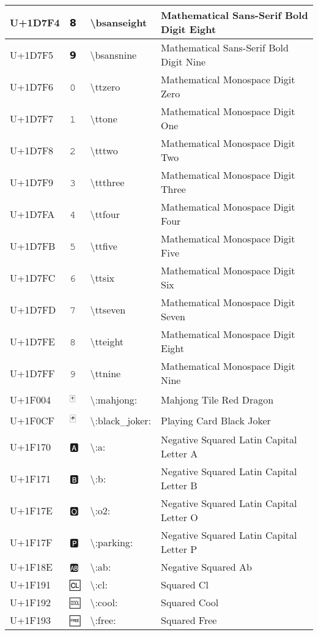 \begin{table}[h]
\begin{tabulary}{\linewidth}{|L|L|L|L|}
\hline
U+1D7F4 & 𝟴 & {\textbackslash}bsanseight & Mathematical Sans-Serif Bold Digit Eight \\
\hline
U+1D7F5 & 𝟵 & {\textbackslash}bsansnine & Mathematical Sans-Serif Bold Digit Nine \\
\hline
U+1D7F6 & 𝟶 & {\textbackslash}ttzero & Mathematical Monospace Digit Zero \\
\hline
U+1D7F7 & 𝟷 & {\textbackslash}ttone & Mathematical Monospace Digit One \\
\hline
U+1D7F8 & 𝟸 & {\textbackslash}tttwo & Mathematical Monospace Digit Two \\
\hline
U+1D7F9 & 𝟹 & {\textbackslash}ttthree & Mathematical Monospace Digit Three \\
\hline
U+1D7FA & 𝟺 & {\textbackslash}ttfour & Mathematical Monospace Digit Four \\
\hline
U+1D7FB & 𝟻 & {\textbackslash}ttfive & Mathematical Monospace Digit Five \\
\hline
U+1D7FC & 𝟼 & {\textbackslash}ttsix & Mathematical Monospace Digit Six \\
\hline
U+1D7FD & 𝟽 & {\textbackslash}ttseven & Mathematical Monospace Digit Seven \\
\hline
U+1D7FE & 𝟾 & {\textbackslash}tteight & Mathematical Monospace Digit Eight \\
\hline
U+1D7FF & 𝟿 & {\textbackslash}ttnine & Mathematical Monospace Digit Nine \\
\hline
U+1F004 & 🀄 & {\textbackslash}:mahjong: & Mahjong Tile Red Dragon \\
\hline
U+1F0CF & 🃏 & {\textbackslash}:black\_joker: & Playing Card Black Joker \\
\hline
U+1F170 & 🅰 & {\textbackslash}:a: & Negative Squared Latin Capital Letter A \\
\hline
U+1F171 & 🅱 & {\textbackslash}:b: & Negative Squared Latin Capital Letter B \\
\hline
U+1F17E & 🅾 & {\textbackslash}:o2: & Negative Squared Latin Capital Letter O \\
\hline
U+1F17F & 🅿 & {\textbackslash}:parking: & Negative Squared Latin Capital Letter P \\
\hline
U+1F18E & 🆎 & {\textbackslash}:ab: & Negative Squared Ab \\
\hline
U+1F191 & 🆑 & {\textbackslash}:cl: & Squared Cl \\
\hline
U+1F192 & 🆒 & {\textbackslash}:cool: & Squared Cool \\
\hline
U+1F193 & 🆓 & {\textbackslash}:free: & Squared Free \\

\end{tabulary}
\end{table}
